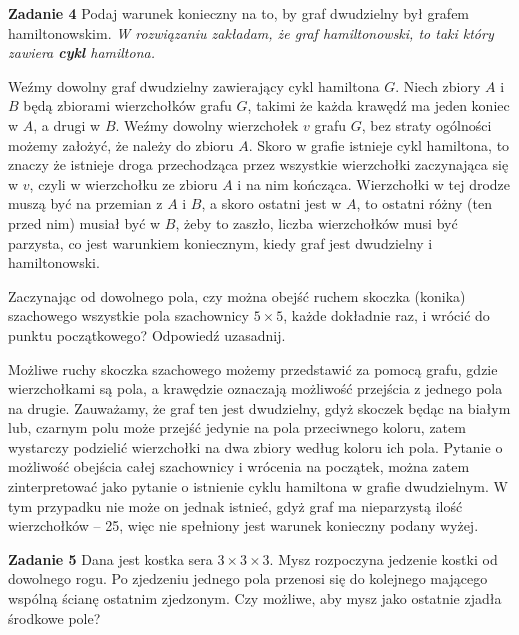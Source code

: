 \documentclass[12pt,a4paper]{article}
\begin{document}
\newpage

\noindent
\textbf{Zadanie 4} Podaj warunek konieczny na to, by graf dwudzielny był grafem hamiltonowskim.
\vskip 0.2cm
\textit{W rozwiązaniu zakładam, że graf hamiltonowski, to taki który zawiera \textbf{cykl} hamiltona.} 

\vskip 0.2cm

Weźmy dowolny graf dwudzielny zawierający cykl hamiltona \(G\). Niech zbiory \(A\) i \(B\) będą zbiorami wierzchołków grafu \(G\), takimi że każda krawędź ma jeden koniec w \(A\), a drugi w \(B\). Weźmy dowolny wierzchołek \(v\) grafu \(G\), bez straty ogólności możemy założyć, że należy do zbioru \(A\). Skoro w grafie istnieje cykl hamiltona, to znaczy że istnieje droga przechodząca przez wszystkie wierzchołki zaczynająca się w \(v\), czyli w wierzchołku ze zbioru \(A\) i na nim kończąca. Wierzchołki w tej drodze muszą być na przemian z \(A\) i \(B\), a skoro ostatni jest w \(A\), to ostatni różny (ten przed nim) musiał być w \(B\), żeby to zaszło, liczba wierzchołków musi być parzysta, co jest warunkiem koniecznym, kiedy graf jest dwudzielny i hamiltonowski.

\vskip 0.2cm

Zaczynając od dowolnego pola, czy można obejść ruchem skoczka (konika) szachowego wszystkie pola szachownicy \( 5 \times 5 \),  każde dokładnie raz, i wrócić do punktu początkowego? Odpowiedź uzasadnij.

\vskip 0.2cm

Możliwe ruchy skoczka szachowego możemy przedstawić za pomocą grafu, gdzie wierzchołkami są pola, a krawędzie oznaczają możliwość przejścia z jednego pola na drugie. Zauważamy, że graf ten jest dwudzielny, gdyż skoczek będąc na białym lub, czarnym polu może przejść jedynie na pola przeciwnego koloru, zatem wystarczy podzielić wierzchołki na dwa zbiory według koloru ich pola. Pytanie o możliwość obejścia całej szachownicy i wrócenia na początek, można zatem zinterpretować jako pytanie o istnienie cyklu hamiltona w grafie dwudzielnym. W tym przypadku nie może on jednak istnieć, gdyż graf ma nieparzystą ilość wierzchołków -- 25, więc nie spełniony jest warunek konieczny podany wyżej.

\newpage

\noindent
\textbf{Zadanie 5} Dana jest kostka sera \( 3 \times 3 \times 3 \). Mysz rozpoczyna jedzenie kostki
od dowolnego rogu. Po zjedzeniu jednego pola przenosi się do kolejnego mającego wspólną ścianę
ostatnim zjedzonym. Czy możliwe, aby mysz jako ostatnie zjadła środkowe pole?
\end{document}
